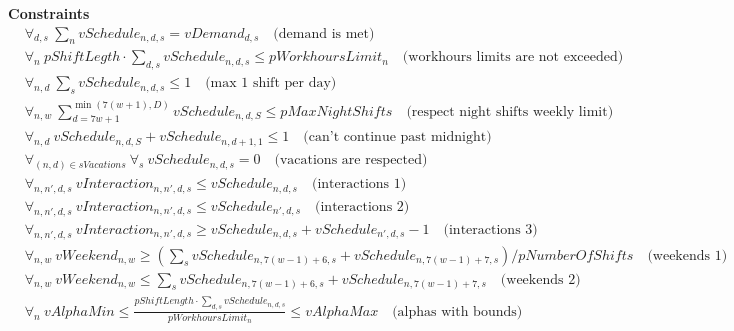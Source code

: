 \documentclass{article}
\begin{document}
\textbf{Constraints}
\begin{align*}
&\forall_{d,s}\ \sum_n vSchedule_{n,d,s} = vDemand_{d, s}\quad \text{(demand is met)} \\
&\forall_{n}\ pShiftLegth\cdot\sum_{d, s} vSchedule_{n,d,s} \leq pWorkhoursLimit_n \quad \text{(workhours limits are not exceeded)} \\
&\forall_{n,d}\ \sum_s vSchedule_{n,d,s} \leq 1\quad \text{(max 1 shift per day)} \\
&\forall_{n,w}\ \sum_{d=7w+1}^{\min(7(w+1), D)} vSchedule_{n,d,S} \leq pMaxNightShifts \quad \text{(respect night shifts weekly limit)} \\
&\forall_{n,d}\ vSchedule_{n,d,S}+vSchedule_{n,d+1,1} \leq 1\quad \text{(can't continue past midnight)} \\
&\forall_{(n,d)\in sVacations}\ \forall_s\ vSchedule_{n,d,s} = 0\quad \text{(vacations are respected)} \\
&\forall_{n,n',d,s}\ vInteraction_{n,n',d,s} \leq vSchedule_{n,d,s}\quad \text{(interactions 1)} \\
&\forall_{n,n',d,s}\ vInteraction_{n,n',d,s} \leq vSchedule_{n',d,s}\quad \text{(interactions 2)} \\
&\forall_{n,n',d,s}\ vInteraction_{n,n',d,s} \geq vSchedule_{n,d,s}+vSchedule_{n',d,s}-1\quad \text{(interactions 3)} \\
&\forall_{n, w}\ vWeekend_{n, w} \geq (\sum_s vSchedule_{n, 7(w-1)+6, s} + vSchedule_{n, 7(w-1)+7, s})/pNumberOfShifts \quad \text{(weekends 1)} \\
&\forall_{n, w}\ vWeekend_{n, w} \leq \sum_s vSchedule_{n, 7(w-1)+6, s} + vSchedule_{n, 7(w-1)+7, s} \quad \text{(weekends 2)} \\
&\forall_{n}\ vAlphaMin \leq \frac{pShiftLength\cdot\sum_{d,s}vSchedule_{n,d,s}}{pWorkhoursLimit_n} \leq vAlphaMax\quad \text{(alphas with bounds)}
\end{align*}
\end{document}
